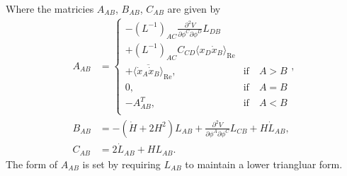 Where the matricies $A_{AB}$, $B_{AB}$, $C_{AB}$ are given by
\begin{align}
  A_{AB} & =
  \begin{cases}
    -(L^{-1})_{AC}\frac{\partial^2V}{\partial\phi^C\partial\phi^D}L_{DB} \\
    + (L^{-1})_{AC}C_{CD}\langle x_D\dot{x}_B\rangle_\mathrm{Re} \\
    + \overline{\langle \dot{x}_A\dot{x}_B \rangle}_\mathrm{Re}, &  \text{if} \quad A>B \\
    0, &  \text{if} \quad A=B \\
    -A_{AB}^T, & \text{if} \quad A<B \\
  \end{cases}, \\
  B_{AB} & = -(\dot{H} + 2H^2)L_{AB} + \frac{\partial^2V}{\partial\phi^A\partial\phi^C}L_{CB} + H\dot{L}_{AB}, \\
  C_{AB} & = 2\dot{L}_{AB} + HL_{AB}.
\end{align}
The form of $A_{AB}$ is set by requiring $L_{AB}$ to maintain a lower triangluar form.

